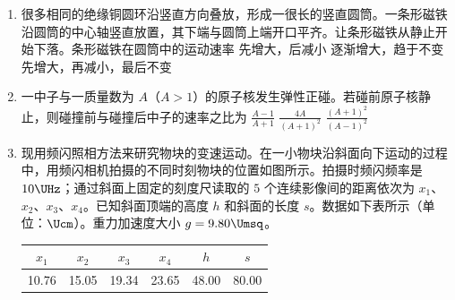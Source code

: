 \documentclass[\gkver]{gaokaozhenti}
\begin{document}
\begin{enumerate}
\item
很多相同的绝缘铜圆环沿竖直方向叠放，形成一很长的竖直圆筒。一条形磁铁沿圆筒的中心轴竖直放置，其下端与圆筒上端开口平齐。让条形磁铁从静止开始下落。条形磁铁在圆筒中的运动速率
{先增大，后减小}
{逐渐增大，趋于不变}
{先增大，再减小，最后不变}

\item
一中子与一质量数为 $A$（$A>1$）的原子核发生弹性正碰。若碰前原子核静止，则碰撞前与碰撞后中子的速率之比为
{$\frac{A-1}{A+1}$}
{$\frac{4A}{(A+1)^2}$}
{$\frac{(A+1)^2}{(A-1)^2}$}

\item
现用频闪照相方法来研究物块的变速运动。在一小物块沿斜面向下运动的过程中，用频闪相机拍摄的不同时刻物块的位置如图所示。拍摄时频闪频率是 $10\UHz$；通过斜面上固定的刻度尺读取的 $5$ 个连续影像间的距离依次为 $x_1$、$x_2$、$x_3$、$x_4$。已知斜面顶端的高度 $h$ 和斜面的长度 $s$。数据如下表所示（单位：$\Ucm$）。重力加速度大小 $g=9.80\Umsq$。

\begin{center}
\begin{tabular}{|c|c|c|c|c|c|}
\hline
$x_1$ & $x_2$ & $x_3$ & $x_4$ & $h$ & $s$ \\ \hline
10.76 & 15.05 & 19.34 & 23.65 & 48.00 & 80.00 \\ \hline
\end{tabular}
\end{center}


\end{enumerate}
\end{document}
